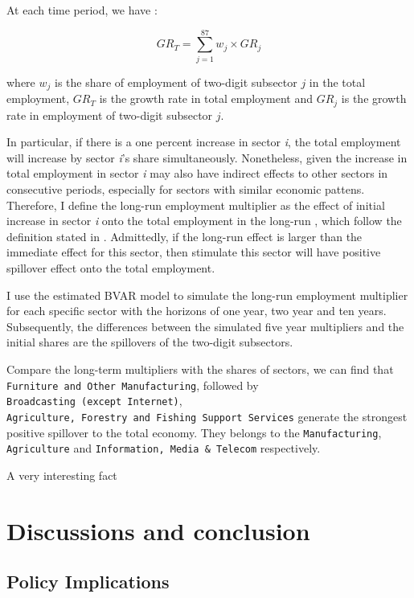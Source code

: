 \documentclass{monashthesis}
\begin{document}
At each time period, we have :

\[
GR_T=\sum_{j=1}^{87} w_j\times {GR}_j
\]

where \(w_j\) is the share of employment of two-digit subsector \(j\) in the total employment, \(GR_T\) is the growth rate in total employment and \(GR_j\) is the growth rate in employment of two-digit subsector \(j\).

In particular, if there is a one percent increase in sector \emph{i}, the total employment will increase by sector \emph{i}'s share simultaneously. Nonetheless, given the increase in total employment in sector \emph{i} may also have indirect effects to other sectors in consecutive periods, especially for sectors with similar economic pattens. Therefore, I define the long-run employment multiplier as the effect of initial increase in sector \emph{i} onto the total employment in the long-run , which follow the definition stated in \textcite{anderson2020}. Admittedly, if the long-run effect is larger than the immediate effect for this sector, then stimulate this sector will have positive spillover effect onto the total employment.

I use the estimated BVAR model to simulate the long-run employment multiplier for each specific sector with the horizons of one year, two year and ten years. Subsequently, the differences between the simulated five year multipliers and the initial shares are the spillovers of the two-digit subsectors.

Compare the long-term multipliers with the shares of sectors, we can find that \texttt{Furniture\ and\ Other\ Manufacturing}, followed by \texttt{Broadcasting\ (except\ Internet)}, \texttt{Agriculture,\ Forestry\ and\ Fishing\ Support\ Services} generate the strongest positive spillover to the total economy. They belongs to the \texttt{Manufacturing}, \texttt{Agriculture} and \texttt{Information,\ Media\ \&\ Telecom} respectively.

A very interesting fact

\hypertarget{discussions-and-conclusion}{%
\chapter{Discussions and conclusion}\label{discussions-and-conclusion}}

\hypertarget{policy-implications}{%
\section{Policy Implications}\label{policy-implications}}
\end{document}

